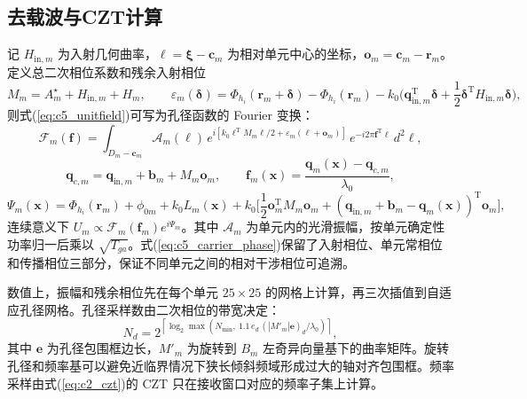 \subsection{去载波与CZT计算}

记 $H_{\mathrm{in},m}$ 为入射几何曲率，$\boldsymbol\ell=\boldsymbol\xi-\mathbf c_m$ 为相对单元中心的坐标，$\mathbf o_m=\mathbf c_m-\mathbf r_m$。定义总二次相位系数和残余入射相位
\begin{equation}
M_m=A_m^\star+H_{\mathrm{in},m}+H_m,\qquad
\varepsilon_m(\boldsymbol\delta)=\Phi_{h_i}(\mathbf r_m+\boldsymbol\delta)-\Phi_{h_i}(\mathbf r_m)
-k_0\Big(\mathbf q_{\mathrm{in},m}^{\mathrm T}\boldsymbol\delta+\frac12\boldsymbol\delta^{\mathrm T}H_{\mathrm{in},m}\boldsymbol\delta\Big),
\label{eq:c5_residual}
\end{equation}
则式(\ref{eq:c5_unitfield})可写为孔径函数的 Fourier 变换：
\begin{equation}
\mathcal F_m(\mathbf f)=\int_{D_m-\mathbf c_m}\mathcal A_m(\boldsymbol\ell)\,
e^{i[k_0\boldsymbol\ell^{\mathrm T}M_m\boldsymbol\ell/2+\varepsilon_m(\boldsymbol\ell+\mathbf o_m)]}\,
e^{-i2\pi\mathbf f^{\mathrm T}\boldsymbol\ell}\,d^2\boldsymbol\ell,
\label{eq:c5_fourier}
\end{equation}
\begin{equation}
\mathbf q_{c,m}=\mathbf q_{\mathrm{in},m}+\mathbf b_m+M_m\mathbf o_m,\qquad
\mathbf f_m(\mathbf x)=\frac{\mathbf q_m(\mathbf x)-\mathbf q_{c,m}}{\lambda_0},
\label{eq:c5_freq}
\end{equation}
\begin{equation}
\Psi_m(\mathbf x)=\Phi_{h_i}(\mathbf r_m)+\phi_{0m}+k_0L_m(\mathbf x)
+k_0\Big[\frac12\mathbf o_m^{\mathrm T}M_m\mathbf o_m+(\mathbf q_{\mathrm{in},m}+\mathbf b_m-\mathbf q_m(\mathbf x))^{\mathrm T}\mathbf o_m\Big],
\label{eq:c5_carrier_phase}
\end{equation}
连续意义下 $U_m\propto\mathcal F_m(\mathbf f_m)e^{i\Psi_m}$。其中 $\mathcal A_m$ 为单元内的光滑振幅，按单元确定性功率归一后乘以 $\sqrt{T_{ga}}$。式(\ref{eq:c5_carrier_phase})保留了入射相位、单元常相位和传播相位三部分，保证不同单元之间的相对干涉相位可追溯。

数值上，振幅和残余相位先在每个单元 $25\times25$ 的网格上计算，再三次插值到自适应孔径网格。孔径采样数由二次相位的带宽决定：
\begin{equation}
N_d=2^{\left\lceil\log_2\max\left(N_{\min},\ 1.1\,e_d\,(|M'_m|\mathbf e)_d/\lambda_0\right)\right\rceil},
\label{eq:c5_sampling}
\end{equation}
其中 $\mathbf e$ 为孔径包围框边长，$M'_m$ 为旋转到 $B_m$ 左奇异向量基下的曲率矩阵。旋转孔径和频率基可以避免近临界情况下狭长倾斜频域形成过大的轴对齐包围框。频率采样由式(\ref{eq:c2_czt})的 CZT 只在接收窗口对应的频率子集上计算。

